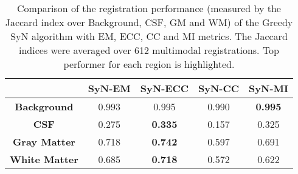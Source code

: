 \begin{table}[htbp]
  \centering
  {\small
    \begin{tabular}{ccccc}
    \toprule
          & \textbf{SyN-EM} & \textbf{SyN-ECC} & \textbf{SyN-CC} & \textbf{SyN-MI} \\
    \midrule
    \textbf{Background} & 0.993 & 0.995 & 0.990 & \textbf{0.995} \\
    \textbf{CSF} & 0.275 & \textbf{0.335} & 0.157 & 0.325 \\
    \textbf{Gray Matter} & 0.718 & \textbf{0.742} & 0.597 & 0.691 \\
    \textbf{White Matter} & 0.685 & \textbf{0.718} & 0.572 & 0.622 \\
    \bottomrule
    \end{tabular}}%
  \caption{Comparison of the registration performance (measured by the Jaccard index over Background, CSF, GM and WM) of the Greedy SyN algorithm with EM, ECC, CC and MI metrics.
The Jaccard indices were averaged over 612 multimodal registrations. Top performer for each region is highlighted.}
  \label{tab:multimodal_results_segTri_fill}%
\end{table}%
